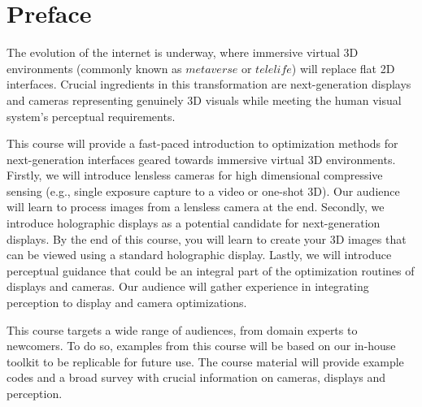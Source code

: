 \chapter*{Preface}
The evolution of the internet is underway, where immersive virtual 3D environments (commonly known as $\textit{metaverse}$ or $\textit{telelife}$) will replace flat 2D interfaces.
Crucial ingredients in this transformation are next-generation displays and cameras representing genuinely 3D visuals while meeting the human visual system's perceptual requirements.

This course will provide a fast-paced introduction to optimization methods for next-generation interfaces geared towards immersive virtual 3D environments.
Firstly, we will introduce lensless cameras for high dimensional compressive sensing (e.g., single exposure capture to a video or one-shot 3D).
Our audience will learn to process images from a lensless camera at the end.
Secondly, we introduce holographic displays as a potential candidate for next-generation displays.
By the end of this course, you will learn to create your 3D images that can be viewed using a standard holographic display.
Lastly, we will introduce perceptual guidance that could be an integral part of the optimization routines of displays and cameras.
Our audience will gather experience in integrating perception to display and camera optimizations.

This course targets a wide range of audiences, from domain experts to newcomers.
To do so, examples from this course will be based on our in-house toolkit to be replicable for future use.
The course material will provide example codes and a broad survey with crucial information on cameras, displays and perception.

